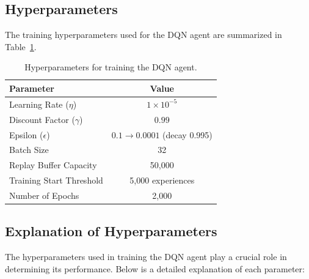 \documentclass[a4paper,12pt]{article}
\begin{document}
\subsection{Hyperparameters}
The training hyperparameters used for the DQN agent are summarized in Table~\ref{tab:hyperparameters}.
\begin{table}[h!]
\centering
\begin{tabular}{|l|c|}
\hline
\textbf{Parameter}           & \textbf{Value}          \\ \hline
Learning Rate (\(\eta\))     & \(1 \times 10^{-5}\)     \\ \hline
Discount Factor (\(\gamma\)) & \(0.99\)                \\ \hline
Epsilon (\(\epsilon\))       & \(0.1 \rightarrow 0.0001\) (decay 0.995) \\ \hline
Batch Size                   & 32                      \\ \hline
Replay Buffer Capacity       & 50,000                  \\ \hline
Training Start Threshold     & 5,000 experiences       \\ \hline
Number of Epochs             & 2,000                   \\ \hline
\end{tabular}
\caption{Hyperparameters for training the DQN agent.}
\label{tab:hyperparameters}
\end{table}

\subsection{Explanation of Hyperparameters}
The hyperparameters used in training the DQN agent play a crucial role in determining its performance. Below is a detailed explanation of each parameter:
\end{document}

